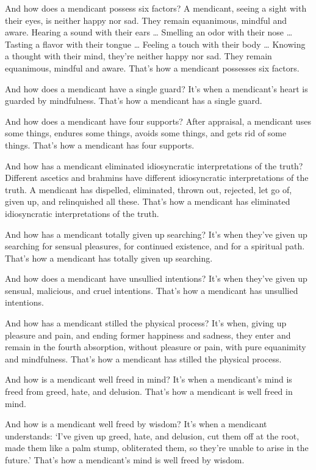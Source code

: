 \documentclass[12pt,openany]{book}%
\begin{document}
And how does a mendicant possess six factors? A mendicant, seeing a sight with their eyes, is neither happy nor sad. They remain equanimous, mindful and aware. Hearing a sound with their ears … Smelling an odor with their nose … Tasting a flavor with their tongue … Feeling a touch with their body … Knowing a thought with their mind, they’re neither happy nor sad. They remain equanimous, mindful and aware. That’s how a mendicant possesses six factors. 

And how does a mendicant have a single guard? It’s when a mendicant’s heart is guarded by mindfulness. That’s how a mendicant has a single guard. 

And how does a mendicant have four supports? After appraisal, a mendicant uses some things, endures some things, avoids some things, and gets rid of some things. That’s how a mendicant has four supports. 

And how has a mendicant eliminated idiosyncratic interpretations of the truth? Different ascetics and brahmins have different idiosyncratic interpretations of the truth. A mendicant has dispelled, eliminated, thrown out, rejected, let go of, given up, and relinquished all these. That’s how a mendicant has eliminated idiosyncratic interpretations of the truth. 

And how has a mendicant totally given up searching? It’s when they’ve given up searching for sensual pleasures, for continued existence, and for a spiritual path. That’s how a mendicant has totally given up searching. 

And how does a mendicant have unsullied intentions? It’s when they’ve given up sensual, malicious, and cruel intentions. That’s how a mendicant has unsullied intentions. 

And how has a mendicant stilled the physical process? It’s when, giving up pleasure and pain, and ending former happiness and sadness, they enter and remain in the fourth absorption, without pleasure or pain, with pure equanimity and mindfulness. That’s how a mendicant has stilled the physical process. 

And how is a mendicant well freed in mind? It’s when a mendicant’s mind is freed from greed, hate, and delusion. That’s how a mendicant is well freed in mind. 

And how is a mendicant well freed by wisdom? It’s when a mendicant understands: ‘I’ve given up greed, hate, and delusion, cut them off at the root, made them like a palm stump, obliterated them, so they’re unable to arise in the future.’ That’s how a mendicant’s mind is well freed by wisdom. 
\end{document}
